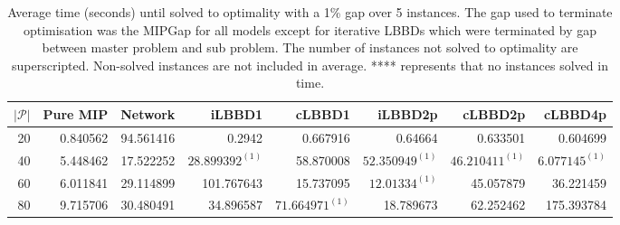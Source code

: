 \begin{table*}
    \centering
    \caption{Average time (seconds) until solved to optimality with a 1\% gap over 5 instances. The gap used to terminate optimisation was the MIPGap for all models except for iterative LBBDs which were terminated by gap between master problem and sub problem. The number of instances not solved to optimality are superscripted. Non-solved instances are not included in average. **** represents that no instances solved in time.}
    \begin{tabular}{rrrrrrrr} \toprule
        $|\mathcal{P}|$ & Pure MIP & Network & iLBBD1 & cLBBD1 & iLBBD2p & cLBBD2p & cLBBD4p \\ \midrule
       20&  0.840562 & 94.561416 & 0.2942 & 0.667916 & 0.64664 & 0.633501 & 0.604699 \\
       40  &5.448462 & 17.522252 & $28.899392^{(1)}$&  58.870008&  $52.350949^{(1)}$ & $46.210411^{(1)}$ & $6.077145^{(1)}$ \\
       60 & 6.011841&  29.114899&  101.767643 & 15.737095&  $12.01334^{(1)}$&  45.057879 & 36.221459\\
       80 & 9.715706&  30.480491&  34.896587 & $71.664971^{(1)}$&  18.789673 & 62.252462 & 175.393784\\
       \bottomrule
    \end{tabular}
\end{table*}
